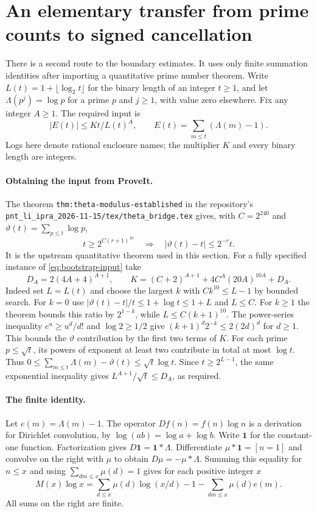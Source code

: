 \section{An elementary transfer from prime counts to signed cancellation}
\label{sec:bootstrap}
There is a second route to the boundary estimates. It uses only finite
summation identities after importing a quantitative prime number theorem.
Write $L(t)=1+\lfloor\log_2 t\rfloor$ for the binary length of an integer
$t\ge1$, and let $\Lambda(p^j)=\log p$ for a prime $p$ and $j\ge1$,
with value zero elsewhere. Fix any integer $A\ge1$. The required input is
\begin{equation}\label{eq:bootstrap-input}
    |E(t)|\le Kt/L(t)^A,\qquad E(t)=\sum_{m\le t}(\Lambda(m)-1).
\end{equation}
Logs here denote rational enclosure names; the multiplier $K$ and every
binary length are integers.

\paragraph{Obtaining the input from ProveIt.}
The theorem \texttt{thm:theta-modulus-established} in the repository's
\texttt{pnt\_li\_ipra\_2026-11-15/tex/theta\_bridge.tex} gives, with
$C=2^{240}$ and $\vartheta(t)=\sum_{p\le t}\log p$,
\[
  t\ge2^{C(r+1)^{10}}\quad\Longrightarrow\quad
  |\vartheta(t)-t|\le2^{-r}t.
\]
It is the upstream quantitative theorem used in this section.
For a fully specified instance of \eqref{eq:bootstrap-input} take
\[
 D_A=2(4A+4)^{A+1},\qquad
 K=(C+2)^{A+1}+4C^A(20A)^{10A}+D_A.
\]
Indeed set $L=L(t)$ and choose the largest $k$ with $Ck^{10}\le L-1$
by bounded search. For $k=0$ use
$|\vartheta(t)-t|/t\le1+\log t\le1+L$ and $L\le C$.
For $k\ge1$ the theorem bounds this ratio by $2^{1-k}$, while
$L\le C(k+1)^{10}$. The power-series inequality
$e^u\ge u^d/d!$ and $\log2\ge1/2$ give
$(k+1)^d 2^{-k}\le 2(2d)^d$ for $d\ge1$.
This bounds the $\vartheta$ contribution by the first two terms of $K$.
For each prime $p\le\sqrt t$, its powers of exponent at least two contribute
in total at most $\log t$. Thus
$0\le \sum_{m\le t}\Lambda(m)-\vartheta(t)\le\sqrt t\log t$.
Since $t\ge2^{L-1}$, the same exponential inequality gives
$L^{A+1}/\sqrt t\le D_A$, as required.

\paragraph{The finite identity.}
Let $e(m)=\Lambda(m)-1$. The operator $Df(n)=f(n)\log n$ is a derivation
for Dirichlet convolution, by $\log(ab)=\log a+\log b$. Write $\mathbf1$
for the constant-one function. Factorization gives
$D\mathbf1=\mathbf1*\Lambda$. Differentiate $\mu*\mathbf1=[n=1]$
and convolve on the right with $\mu$ to obtain $D\mu=-\mu*\Lambda$.
Summing this equality for $n\le x$ and using
$\sum_{dm\le x}\mu(d)=1$ gives for each positive integer $x$
\begin{equation}\label{eq:bootstrap-identity}
 M(x)\log x
 =\sum_{d\le x}\mu(d)\log(x/d)-1
       -\sum_{dm\le x}\mu(d)e(m).
\end{equation}
All sums on the right are finite.

